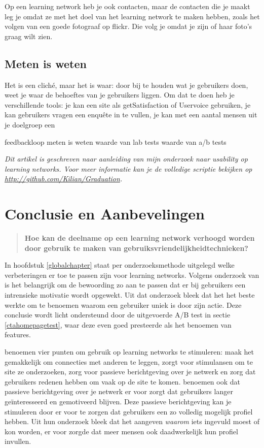 \documentclass[a4paper, 10pt, pdftex]{report}
\begin{document}
    Op een learning network heb je ook contacten, maar de contacten die je maakt leg je omdat ze met het doel van het learning network te maken hebben, zoals het volgen van een goede fotograaf op flickr. Die volg je omdat je zijn of haar foto's graag wilt zien.

    \section{Meten is weten}
      Het is een clich\'e, maar het is waar: door bij te houden wat je gebruikers doen, weet je waar de behoeftes van je gebruikers liggen. Om dat te doen heb je verschillende tools: je kan een site als getSatisfaction of Uservoice gebruiken, je kan gebruikers vragen een enqu\^ete in te vullen, je kan met een aantal mensen uit je doelgroep een

    feedbackloop
    meten is weten
      waarde van lab tests
      waarde van a/b tests


      \emph{Dit artikel is geschreven naar aanleiding van mijn onderzoek naar usability op learning networks. Voor meer informatie kan je de volledige scriptie bekijken op \url{http://github.com/Kilian/Graduation}.}


  \newpage
  \chapter*{Conclusie en Aanbevelingen}

    \begin{quotation}
      \textbf{Hoe kan de deelname op een learning network verhoogd worden door gebruik te maken van gebruiksvriendelijkheidtechnieken?}
    \end{quotation}

    In hoofdstuk \ref{globalchapter} staat per onderzoeksmethode uitgelegd welke verbeteringen er toe te passen zijn voor learning networks. Volgens onderzoek van \citeauthor{Beenen2004} is het belangrijk om de bewoording zo aan te passen dat er bij gebruikers een intrensieke motivatie wordt opgewekt. Uit dat onderzoek bleek dat het het beste werkte om te benoemen waarom een gebruiker uniek is door zijn actie. Deze conclusie wordt licht ondersteund door de uitgevoerde A/B test in sectie \ref{ctahomepagetest}, waar deze even goed presteerde als het benoemen van features.

    \citeauthor{Sohn2005} benoemen vier punten om gebruik op learning networks te stimuleren: maak het gemakkelijk om connecties met anderen te leggen, zorgt voor stimulansen om te site ze onderzoeken, zorg voor passieve berichtgeving over je netwerk en zorg dat gebruikers redenen hebben om vaak op de site te komen. \citeauthor{Brouns2008} benoemen ook dat passieve berichtgeving over je netwerk er voor zorgt dat gebruikers langer ge\"interesseerd en gemotiveerd blijven. Deze passieve berichtgeving kan je stimuleren door er voor te zorgen dat gebruikers een zo volledig mogelijk profiel hebben. Uit hun onderzoek bleek dat het aangeven \emph{waarom} iets ingevuld moest of kon worden, er voor zorgde dat meer mensen ook daadwerkelijk hun profiel invullen.
\end{document}

